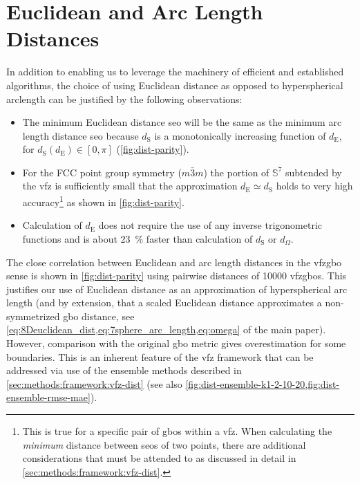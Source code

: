 \documentclass[preprint,12pt]{elsarticle}
\begin{document}


\section{Euclidean and Arc Length Distances}
\label{sec:supp:dist-parity}

In addition to enabling us to leverage the machinery of efficient and established algorithms, the choice of using Euclidean distance as opposed to hyperspherical arclength can be justified by the following observations:
\begin{itemize}
	\item The minimum Euclidean distance \gls{seo} will be the same as the minimum arc length distance \gls{seo} because $d_{\text{S}}$ is a monotonically increasing function of $d_{\text{E}}$, for $d_{\text{S}}\!\left(d_{\text{E}}\right)\in[0,\pi]$ (\cref{fig:dist-parity}). 
	\item For the FCC point group symmetry ($m\bar{3}m$) the portion of $\mathbb{S}^7$ subtended by the \gls{vfz} is sufficiently small that the approximation $d_{\text{E}} \simeq d_{\text{S}}$ holds to very high accuracy\footnote{This is true for a specific pair of \glspl{gbo} within a \gls{vfz}. When calculating the \emph{minimum} distance between \glspl{seo} of two points, there are additional considerations that must be attended to as discussed in detail in \cref{sec:methods:framework:vfz-dist}.} as shown in \cref{fig:dist-parity}. 
	\item Calculation of $d_{\text{E}}$ does not require the use of any inverse trigonometric functions and is about \SI{23}{\percent} faster than calculation of $d_{\text{S}}$ or $d_\Omega$.
\end{itemize}

The close correlation between Euclidean and arc length distances in the \gls{vfzgbo} sense is shown in \cref{fig:dist-parity} using pairwise distances of \num{10000} \glspl{vfzgbo}. This justifies our use of Euclidean distance as an approximation of hyperspherical arc length (and by extension, that a scaled Euclidean distance approximates a non-symmetrized \gls{gbo} distance, see \cref{eq:8Deuclidean_dist,eq:7sphere_arc_length,eq:omega} of the main paper). However, comparison with the original \gls{gbo} metric \cite{francisGeodesicOctonionMetric2019} gives overestimation for some boundaries. This is an inherent feature of the \gls{vfz} framework that can be addressed via use of the ensemble methods described in \cref{sec:methods:framework:vfz-dist} (see also \cref{fig:dist-ensemble-k1-2-10-20,fig:dist-ensemble-rmse-mae}).
\end{document}
